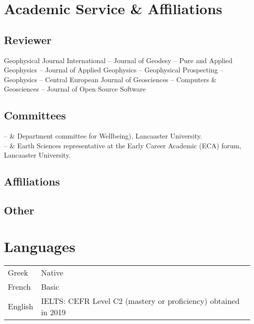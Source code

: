 \documentclass[11pt, a4paper]{article}
\newcommand{\LU}{Lancaaster University}
\newcommand{\TablePad}{\vspace{-0.4cm}}
\newcommand{\Duration}[2]{\fontsize{10pt}{0}\selectfont #1--#2}
\newcommand{\Ongoing}{}
\begin{document}
\section{Academic Service \& Affiliations}

%
%
\subsection{Reviewer}

Geophysical Journal International
--
Journal of Geodesy
--
Pure and Applied Geophysics
--
Journal of Applied Geophysics
--
Geophysical Prospecting
--
Geophysics
--
Central European Journal of Geosciences
--
Computers \& Geosciences
--
Journal of Open Source Software

\subsection{Committees}

\begin{EntriesTable}
\Duration{2018}{\Ongoing} &
  Department committee for Wellbeing),
  \LU.
  \\
\Duration{2018}{\Ongoing} &
  Earth Sciences representative at the Early Career Academic (ECA) forum,
  \LU.
\end{EntriesTable}

\subsection{Affiliations}

\begin{EntriesTable}
\end{EntriesTable}

\subsection{Other}

\begin{EntriesTable}
\end{EntriesTable}


\section{Languages}

\TablePad
\begin{tabularx}{\textwidth}{@{}p{} p{}@{}}
  Greek & Native
  \\
  French & Basic
    \\
  English & IELTS: CEFR Level C2 (mastery or proficiency) obtained in 2019
\end{tabularx}
\end{document}
